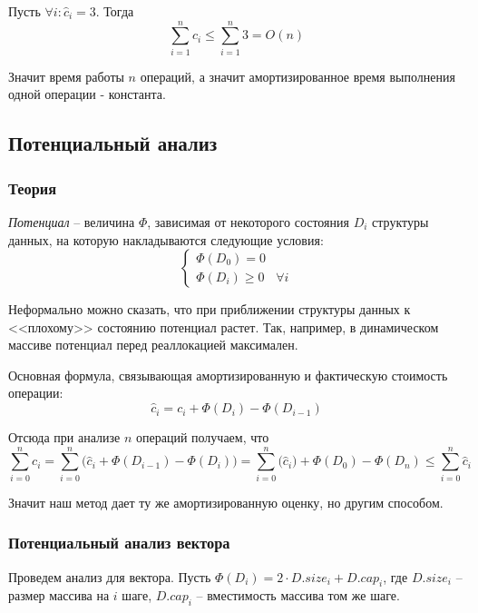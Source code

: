 \documentclass[../main.tex]{subfiles}
\begin{document}
	Пусть $\forall i: \hat c_i = 3$. Тогда %
	\[
	\sum_{i = 1}^{n} c_i \leqslant \sum_{i = 1}^{n} 3 = O(n)
	\]
	
	Значит время работы $n$ операций, а значит амортизированное время выполнения одной операции - константа. 
	
	\subsection{Потенциальный анализ}
	
	\subsubsection{Теория}
	
	\begin{definition}
		\textit{Потенциал} -- величина $\Phi$, зависимая от некоторого состояния $D_i$ структуры данных, на которую накладываются следующие условия:
		\[
			\begin{cases}
				\Phi(D_0) = 0 \\
				\Phi(D_i) \geqslant 0 & \forall i
			\end{cases}
		\]
	\end{definition}

	
	Неформально можно сказать, что при приближении структуры данных к <<плохому>> состоянию потенциал растет. Так, например, в динамическом массиве потенциал перед реаллокацией максимален.
	
	
	Основная формула, связывающая амортизированную и фактическую стоимость операции:
	\[
		\hat c_i = c_i + \Phi(D_i) - \Phi(D_{i-1})
	\]

	
	Отсюда при анализе $n$ операций получаем, что
	\[
	\sum_{i = 0}^{n} c_i
	=
	\sum_{i = 0}^{n} 
	\Big(
		\hat c_i + \Phi(D_{i-1}) - \Phi(D_i)
	\Big)
	=
	\sum_{i = 0}^{n}\big(\hat c_i\big) + \Phi(D_0) - \Phi(D_n)
	\leqslant \sum_{i = 0}^{n} \hat c_i
	\]
	
	Значит наш метод дает ту же амортизированную оценку, но другим способом.
	
	
	\subsubsection{Потенциальный анализ вектора}
	Проведем анализ для вектора. Пусть $\Phi(D_i) = 2 \cdot D.size_i + D.cap_i$, где $D.size_i$ -- размер массива на $i$ шаге, $D.cap_i$ -- вместимость массива том же шаге.
	
\end{document}
